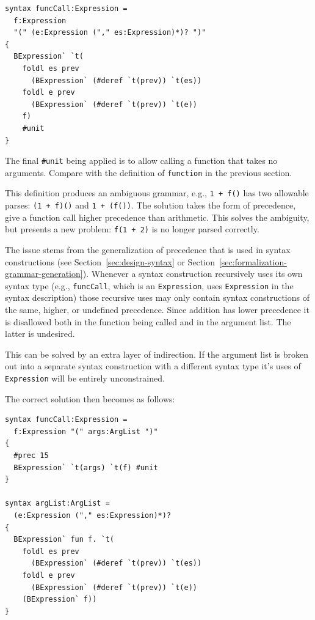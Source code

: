 \documentclass{kththesis}
\begin{document}
\begin{verbatim}
syntax funcCall:Expression =
  f:Expression
  "(" (e:Expression ("," es:Expression)*)? ")"
{
  BExpression` `t(
    foldl es prev
      (BExpression` (#deref `t(prev)) `t(es))
    foldl e prev
      (BExpression` (#deref `t(prev)) `t(e))
    f)
    #unit
}
\end{verbatim}

The final \texttt{#unit} being applied is to allow calling a function that takes no arguments. Compare with the definition of \texttt{function} in the previous section. %

This definition produces an ambiguous grammar, e.g., \texttt{1 + f()} has two allowable parses: \texttt{(1 + f)()} and \texttt{1 + (f())}. The solution takes the form of precedence, give a function call higher precedence than arithmetic. This solves the ambiguity, but presents a new problem: \texttt{f(1 + 2)} is no longer parsed correctly.

The issue stems from the generalization of precedence that is used in syntax constructions (see Section~\ref{sec:design-syntax} or Section~\ref{sec:formalization-grammar-generation}). Whenever a syntax construction recursively uses its own syntax type (e.g., \texttt{funcCall}, which is an \texttt{Expression}, uses \texttt{Expression} in the syntax description) those recursive uses may only contain syntax constructions of the same, higher, or undefined precedence. Since addition has lower precedence it is disallowed both in the function being called and in the argument list. The latter is undesired.

This can be solved by an extra layer of indirection. If the argument list is broken out into a separate syntax construction with a different syntax type it's uses of \texttt{Expression} will be entirely unconstrained.

The correct solution then becomes as follows:

\begin{verbatim}
syntax funcCall:Expression =
  f:Expression "(" args:ArgList ")"
{
  #prec 15
  BExpression` `t(args) `t(f) #unit
}

syntax argList:ArgList =
  (e:Expression ("," es:Expression)*)?
{
  BExpression` fun f. `t(
    foldl es prev
      (BExpression` (#deref `t(prev)) `t(es))
    foldl e prev
      (BExpression` (#deref `t(prev)) `t(e))
    (BExpression` f))
}
\end{verbatim}
\end{document}
